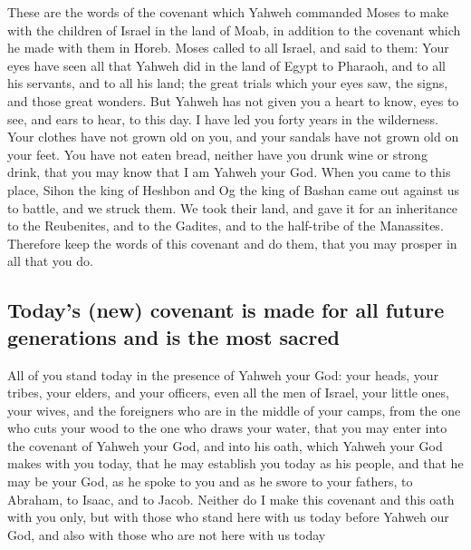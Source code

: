  These are the words of the covenant which Yahweh
commanded Moses to make with the children of Israel in the land of Moab,
in addition to the covenant which he made with them in Horeb.
 Moses called to all Israel, and said to them: Your eyes
have seen all that Yahweh did in the land of Egypt to Pharaoh, and to
all his servants, and to all his land;  the great trials
which your eyes saw, the signs, and those great wonders. 
But Yahweh has not given you a heart to know, eyes to see, and ears to
hear, to this day.  I have led you forty years in the
wilderness. Your clothes have not grown old on you, and your sandals
have not grown old on your feet.  You have not eaten
bread, neither have you drunk wine or strong drink, that you may know
that I am Yahweh your God.  When you came to this place,
Sihon the king of Heshbon and Og the king of Bashan came out against us
to battle, and we struck them.  We took their land, and
gave it for an inheritance to the Reubenites, and to the Gadites, and to
the half-tribe of the Manassites.  Therefore keep the
words of this covenant and do them, that you may prosper in all that you
do.

\hypertarget{todays-new-covenant-is-made-for-all-future-generations-and-is-the-most-sacred}{%
\subsection{Today's (new) covenant is made for all future generations
and is the most
sacred}\label{todays-new-covenant-is-made-for-all-future-generations-and-is-the-most-sacred}}

 All of you stand today in the presence of Yahweh your
God: your heads, your tribes, your elders, and your officers, even all
the men of Israel,  your little ones, your wives, and the
foreigners who are in the middle of your camps, from the one who cuts
your wood to the one who draws your water,  that you may
enter into the covenant of Yahweh your God, and into his oath, which
Yahweh your God makes with you today,  that he may
establish you today as his people, and that he may be your God, as he
spoke to you and as he swore to your fathers, to Abraham, to Isaac, and
to Jacob.  Neither do I make this covenant and this oath
with you only,  but with those who stand here with us
today before Yahweh our God, and also with those who are not here with
us today

